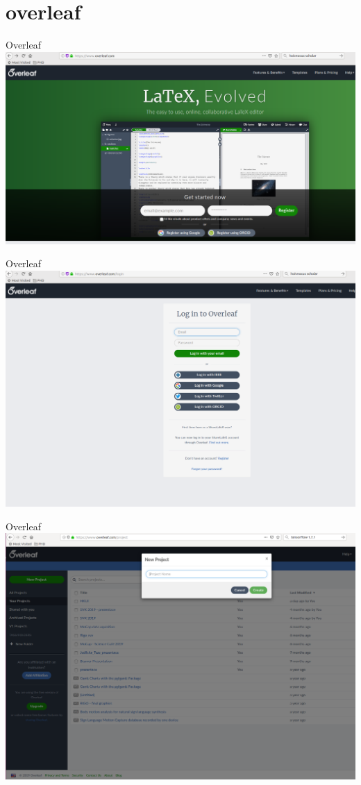 \documentclass{beamer}
\begin{document}
\section{overleaf}
\begin{frame}{Overleaf}
\includegraphics[width=\textwidth]{pic/over1.png}
\end{frame}
\begin{frame}{Overleaf}
\includegraphics[width=\textwidth]{pic/over2.png}
\end{frame}
\begin{frame}{Overleaf}
\includegraphics[width=\textwidth]{pic/over3p5.png}
\end{frame}
\end{document}
